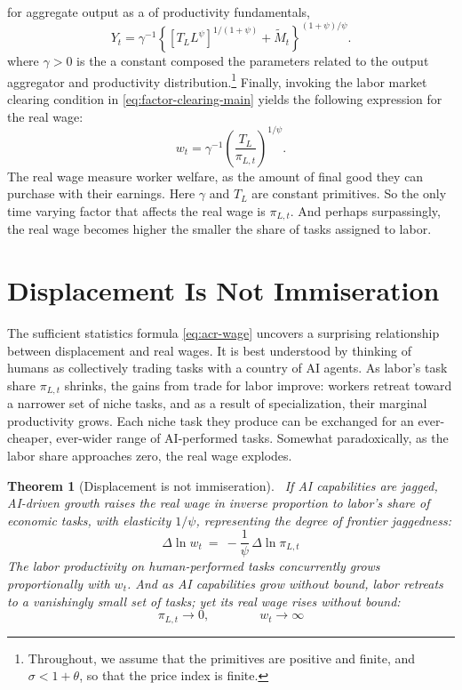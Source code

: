 \documentclass[11pt]{article}
\newtheorem{theorem}{Theorem}
\begin{document}
for aggregate output as a of productivity fundamentals, 
\begin{equation}
Y_{t}=\gamma^{-1}\left\{ [T_{L}L^{\psi}]^{1/(1+\psi)}+\widetilde{M}_{t}\right\} ^{(1+\psi)/\psi}.\label{eq:aggregate-production}
\end{equation}
where $\gamma>0$ is the a constant composed the parameters related
to the output aggregator and productivity distribution.\footnote{Throughout, we assume that the primitives are positive and finite,
and $\sigma<1+\theta$, so that the price index is finite.} Finally, invoking the labor market clearing condition in \eqref{eq:factor-clearing-main}
yields the following expression for the real wage:
\begin{equation}
w_{t}=\gamma^{-1}\left(\frac{T_{L}}{\pi_{L,t}}\right)^{1/\psi}.\label{eq:acr-wage}
\end{equation}
The real wage measure worker welfare, as the amount of final good
they can purchase with their earnings. Here $\gamma$ and $T_{L}$
are constant primitives. So the only time varying factor that affects
the real wage is $\pi_{L,t}$. And perhaps surpassingly, the real
wage becomes higher the smaller the share of tasks assigned to labor.

\section{Displacement Is Not Immiseration}\label{sec:selection}

The sufficient statistics formula \eqref{eq:acr-wage} uncovers a
surprising relationship between displacement and real wages. It is
best understood by thinking of humans as collectively trading tasks
with a country of AI agents. As labor's task share $\pi_{L,t}$ shrinks,
the gains from trade for labor improve: workers retreat toward a narrower
set of niche tasks, and as a result of specialization, their marginal
productivity grows. Each niche task they produce can be exchanged
for an ever-cheaper, ever-wider range of AI-performed tasks. Somewhat
paradoxically, as the labor share approaches zero, the real wage explodes.

\renewcommand{\thetheorem}{\arabic{theorem}.a}
\def\theHtheorem{\arabic{theorem}.a}

\begin{theorem}[Displacement is not immiseration]\label{thm:selection}
~If AI capabilities are jagged, AI-driven growth raises the real wage
in inverse proportion to labor's share of economic tasks, with elasticity
$1/\psi$, representing the degree of frontier jaggedness:
\[
\Delta\ln w_{t}\ =\ -\frac{1}{\psi}\,\Delta\ln\pi_{L,t}
\]
The labor productivity on human-performed tasks concurrently grows
proportionally with $w_{t}$. And as AI capabilities grow without
bound, labor retreats to a vanishingly small set of tasks; yet its
real wage rises without bound:
\begin{equation}
\pi_{L,t}\to0,\qquad\qquad w_{t}\to\infty\label{eq:selection-limits}
\end{equation}
\end{theorem}
\end{document}
